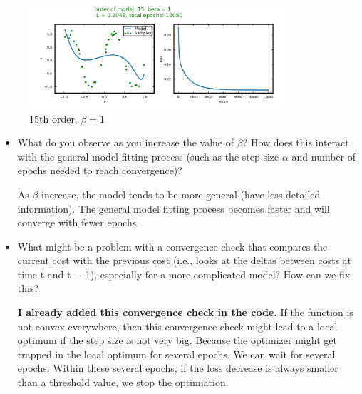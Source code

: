 \begin{figure}[H]
\centering
  \includegraphics[width=0.85\textwidth]{fig/prob2/degree_15_beta_1_loss.png}
\centering 
\caption{\protect 15th order, $\beta = 1$}
\label{fig:15th}
\end{figure}

\begin{itemize}
\item What do you observe as you
increase the value of $\beta$? How does this interact with the general model fitting process (such as the step
size $\alpha$ and number of epochs needed to reach convergence)?

As $\beta$ increase, the model tends to be more general (have less detailed information). The general model fitting process becomes faster and will converge with fewer epochs. 

\item What might be a problem with a convergence check that compares the current cost with the previous cost (i.e., looks at the deltas between costs at time t and t − 1), especially for a more complicated model? How can we fix this?

\textbf{I already added this convergence check in the code.} If the function is not convex everywhere, then this convergence check might lead to a local optimum if the step size is not very big. Because the optimizer might get trapped in the local optimum for several epochs. We can wait for several epochs. Within these several epochs, if the loss decrease is always smaller than a threshold value, we stop the optimiation.
  
\end{itemize}








